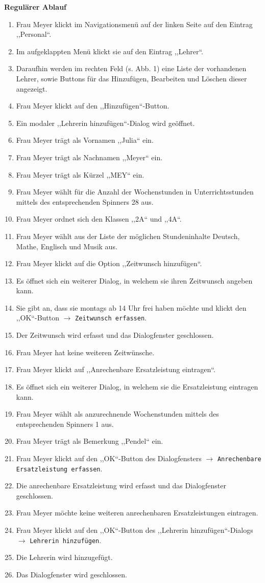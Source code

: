 \documentclass[fontsize=12pt,paper=a4,twoside]{scrartcl}
\begin{document}
\textbf{Regulärer Ablauf}
\begin{enumerate}
\item Frau Meyer klickt im Navigationsmenü auf der linken Seite auf den Eintrag ,,Personal``.
\item Im aufgeklappten Menü klickt sie auf den Eintrag ,,Lehrer``.
\item Daraufhin werden im rechten Feld (s. Abb. 1) eine Liste der vorhandenen Lehrer, sowie Buttons für das Hinzufügen, Bearbeiten und Löschen dieser angezeigt.
\item Frau Meyer klickt auf den ,,Hinzufügen``-Button.
\item Ein modaler ,,Lehrerin hinzufügen``-Dialog wird geöffnet.
\item Frau Meyer trägt als Vornamen ,,Julia`` ein.
\item Frau Meyer trägt als Nachnamen ,,Meyer`` ein.
\item Frau Meyer trägt als Kürzel ,,MEY`` ein.
\item Frau Meyer wählt für die Anzahl der Wochenstunden in Unterrichtsstunden mittels des entsprechenden Spinners 28 aus.
\item Frau Meyer ordnet sich den Klassen ,,2A`` und ,,4A``.
\item Frau Meyer wählt aus der Liste der möglichen Stundeninhalte Deutsch, Mathe, Englisch und Musik aus.
\item Frau Meyer klickt auf die Option ,,Zeitwunsch hinzufügen``.
\item Es öffnet sich ein weiterer Dialog, in welchem sie ihren Zeitwunsch angeben kann.
\item Sie gibt an, dass sie montags ab 14 Uhr frei haben möchte und klickt den ,,OK``-Button $\rightarrow$ \texttt{Zeitwunsch erfassen}.
\item Der Zeitwunsch wird erfasst und das Dialogfenster geschlossen.
\item Frau Meyer hat keine weiteren Zeitwünsche.
\item Frau Meyer klickt auf ,,Anrechenbare Ersatzleistung eintragen``.
\item Es öffnet sich ein weiterer Dialog, in welchem sie die Ersatzleistung eintragen kann.
\item Frau Meyer wählt als anzurechnende Wochenstunden mittels des entsprechenden Spinners 1 aus.
\item Frau Meyer trägt als Bemerkung ,,Pendel`` ein.
\item Frau Meyer klickt auf den ,,OK``-Button des Dialogfensters $\rightarrow$ \texttt{Anrechenbare Ersatzleistung erfassen}.
\item Die anrechenbare Ersatzleistung wird erfasst und das Dialogfenster geschlossen.
\item Frau Meyer möchte keine weiteren anrechenbaren Ersatzleistungen eintragen.
\item Frau Meyer klickt auf den ,,OK``-Button des ,,Lehrerin hinzufügen``-Dialogs $\rightarrow$ \texttt{Lehrerin hinzufügen}.
\item Die Lehrerin wird hinzugefügt.
\item Das Dialogfenster wird geschlossen.
\end{enumerate}
\vspace{5pt}
\end{document}
